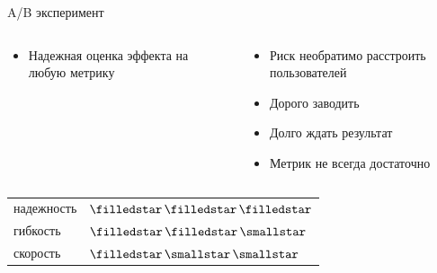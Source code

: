 \documentclass[11pt,aspectratio=169,handout]{beamer}
\begin{document}
\begin{frame}{A/B эксперимент \cite{RSHB}}

\begin{columns}
\begin{column}{0.47\textwidth}
   \begin{tcolorbox}[colback=info!5,colframe=info!80,title=Плюсы]
      \begin{itemize}
      \item Надежная оценка эффекта на любую метрику
      \end{itemize}
    \end{tcolorbox}
\end{column}
\begin{column}{0.47\textwidth}
    \begin{tcolorbox}[colback=warn!5,colframe=warn!80,title=Минусы]
      \begin{itemize}
       \item Риск необратимо расстроить пользователей
       \item Дорого заводить
       \item Долго ждать результат
       \item Метрик не всегда достаточно
      \end{itemize}
    \end{tcolorbox}
\end{column}
\end{columns}

\pause

\begin{large}
\begin{tabular}{ll}
надежность & \color{red}$\filledstar\,\filledstar\,\filledstar$ \\
гибкость & \color{red}$\filledstar\,\filledstar\,\smallstar$ \\
скорость & \color{red}$\filledstar\,\smallstar\,\smallstar$ \\
\end{tabular}
\end{large}


\end{frame}
\end{document}
